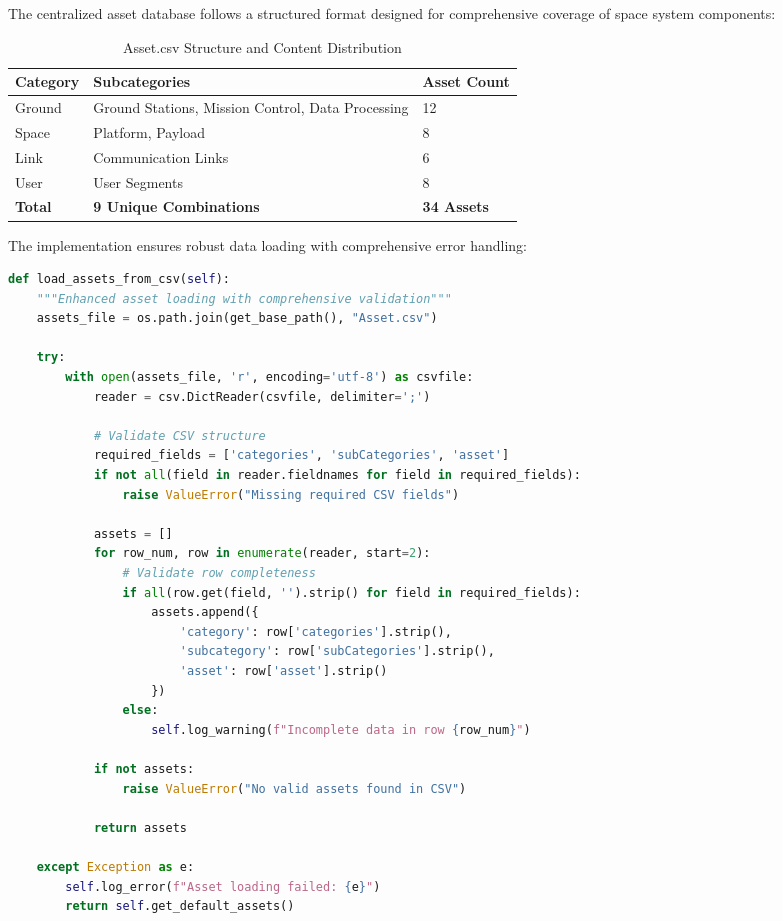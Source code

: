 \documentclass[binding=0.6cm]{sapthesis}
\begin{document}
The centralized asset database follows a structured format designed for comprehensive coverage of space system components:

\begin{table}[H]
\centering
\caption{Asset.csv Structure and Content Distribution}
\begin{tabular}{|l|l|l|}
\hline
\textbf{Category} & \textbf{Subcategories} & \textbf{Asset Count} \\ \hline
Ground & Ground Stations, Mission Control, Data Processing & 12 \\ \hline
Space & Platform, Payload & 8 \\ \hline
Link & Communication Links & 6 \\ \hline
User & User Segments & 8 \\ \hline
\textbf{Total} & \textbf{9 Unique Combinations} & \textbf{34 Assets} \\ \hline
\end{tabular}
\end{table}

The implementation ensures robust data loading with comprehensive error handling:

\begin{lstlisting}[language=Python, caption=Robust Asset Loading with Validation]
def load_assets_from_csv(self):
    """Enhanced asset loading with comprehensive validation"""
    assets_file = os.path.join(get_base_path(), "Asset.csv")
    
    try:
        with open(assets_file, 'r', encoding='utf-8') as csvfile:
            reader = csv.DictReader(csvfile, delimiter=';')
            
            # Validate CSV structure
            required_fields = ['categories', 'subCategories', 'asset']
            if not all(field in reader.fieldnames for field in required_fields):
                raise ValueError("Missing required CSV fields")
            
            assets = []
            for row_num, row in enumerate(reader, start=2):
                # Validate row completeness
                if all(row.get(field, '').strip() for field in required_fields):
                    assets.append({
                        'category': row['categories'].strip(),
                        'subcategory': row['subCategories'].strip(),
                        'asset': row['asset'].strip()
                    })
                else:
                    self.log_warning(f"Incomplete data in row {row_num}")
            
            if not assets:
                raise ValueError("No valid assets found in CSV")
                
            return assets
            
    except Exception as e:
        self.log_error(f"Asset loading failed: {e}")
        return self.get_default_assets()
\end{lstlisting}
\end{document}
